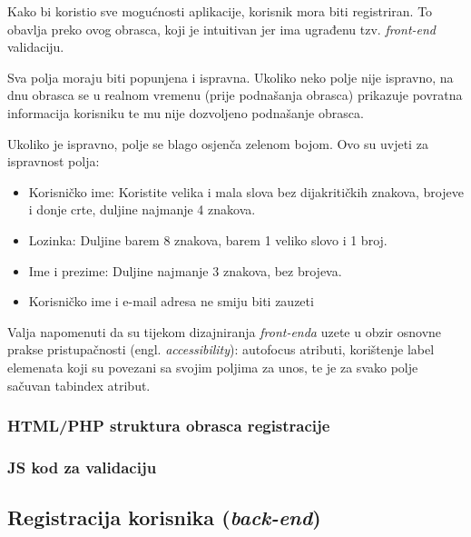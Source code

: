       Kako bi koristio sve mogućnosti aplikacije, korisnik mora biti
      registriran. To obavlja preko ovog obrasca, koji je intuitivan jer ima
      ugrađenu tzv. \textit{front-end} validaciju.

      Sva polja moraju biti popunjena i ispravna. Ukoliko neko polje nije ispravno,
      na dnu obrasca se u realnom vremenu (prije podnašanja obrasca) prikazuje
      povratna informacija korisniku te mu nije dozvoljeno podnašanje
      obrasca.

      Ukoliko je ispravno, polje se blago osjenča zelenom bojom. Ovo su uvjeti za
      ispravnost polja:

      \begin{itemize}
        \item Korisničko ime: Koristite velika i mala slova bez dijakritičkih
        znakova, brojeve i donje crte, duljine najmanje 4 znakova.
        \item Lozinka: Duljine barem 8 znakova, barem 1 veliko slovo i 1 broj.
        \item Ime i prezime: Duljine najmanje 3 znakova, bez brojeva.
        \item Korisničko ime i e-mail adresa ne smiju biti zauzeti
      \end{itemize}

      Valja napomenuti da su tijekom dizajniranja \textit{front-enda} uzete u
      obzir osnovne prakse pristupačnosti (engl. \textit{accessibility}):
      autofocus atributi, korištenje label elemenata koji su povezani sa svojim
      poljima za unos, te je za svako polje sačuvan tabindex atribut.

      \subsubsection{HTML/PHP struktura obrasca registracije}

        

      \subsubsection{JS kod za validaciju}

        

  \subsection{Registracija korisnika (\textit{back-end})}

